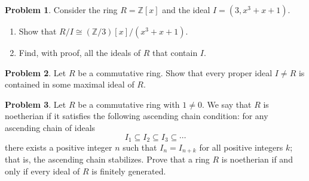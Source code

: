 \documentclass[11pt]{article}
\newcommand{\Z}{\mathbb{Z}}
\theoremstyle{definition}
\newtheorem{problem}{Problem}
\begin{document}
\begin{problem}
Consider the ring $R = \Z[x]$ and the ideal $I = (3, x^3 + x + 1)$.


\begin{enumerate}[label=(2.\arabic*),itemsep=-0.1em]
\vspace{-0.5em}
	\item Show that $R/I \cong (\Z/3)[x]/(x^3 + x + 1)$.
		
	\item Find, with proof, all the ideals of $R$ that contain $I$.
\end{enumerate}
\end{problem}


\begin{problem}
	Let $R$ be a commutative ring. Show that every proper ideal $I \neq R$ is contained in some maximal ideal of $R$.
\end{problem}



\begin{problem}
Let $R$ be a commutative ring with $1 \neq 0$. We say that $R$ is noetherian if it satisfies the following ascending chain condition: for any ascending chain of ideals 
$$I_1 \subseteq I_2 \subseteq I_3 \subseteq \cdots$$ 
there exists a positive integer $n$ such that $I_n=I_{n+k}$ for all positive integers $k$; that is, the ascending chain stabilizes. 
Prove that a ring $R$ is noetherian if and only if every ideal of $R$ is finitely generated.
\end{problem}
\end{document}
